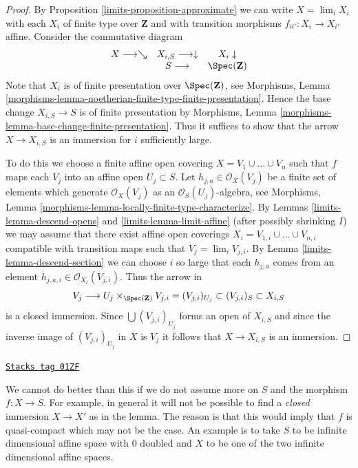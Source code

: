 \begin{proof}

By
Proposition \ref{limits-proposition-approximate}
we can write
$X = \lim_i X_i$ with each $X_i$ of finite type over $\mathbf{Z}$ and
with transition morphisms $f_{ii'} : X_i \to X_{i'}$ affine.
Consider the commutative diagram
$$
\begin{array}{ccc}X \longrightarrow\searrow & X_{i, S} \longrightarrow\downarrow & X_i \downarrow \\  & S \longrightarrow & \Spec(\mathbf{Z})\end{array}
$$
Note that $X_i$ is of finite presentation over $\Spec(\mathbf{Z})$, see
Morphisms,
Lemma \ref{morphisms-lemma-noetherian-finite-type-finite-presentation}.
Hence the base change $X_{i, S} \to S$ is of finite presentation by
Morphisms, Lemma \ref{morphisms-lemma-base-change-finite-presentation}.
Thus it suffices to show that the arrow $X \to X_{i, S}$ is an
immersion for $i$ sufficiently large.

\medskip\noindent
To do this we choose a finite affine open covering
$X = V_1 \cup \ldots \cup V_n$ such that
$f$ maps each $V_j$ into an affine open $U_j \subset S$.
Let $h_{j, a} \in \mathcal{O}_X(V_j)$ be a finite
set of elements which generate $\mathcal{O}_X(V_j)$ as
an $\mathcal{O}_S(U_j)$-algebra, see
Morphisms, Lemma \ref{morphisms-lemma-locally-finite-type-characterize}.
By Lemmas \ref{limits-lemma-descend-opens} and \ref{limits-lemma-limit-affine}
(after possibly shrinking $I$) we may assume that
there exist affine open coverings
$X_i = V_{1, i} \cup \ldots \cup V_{n, i}$
compatible with transition maps such that $V_j = \lim_i V_{j, i}$.
By Lemma \ref{limits-lemma-descend-section} we can choose $i$ so large that each
$h_{j, a}$ comes from an element
$h_{j, a, i} \in \mathcal{O}_{X_i}(V_{j, i})$.
Thus the arrow in
$$
V_j \longrightarrow U_j \times_{\Spec(\mathbf{Z})} V_{j, i} =
(V_{j, i})_{U_j} \subset (V_{j, i})_S \subset X_{i, S}
$$
is a closed immersion. Since $\bigcup (V_{j, i})_{U_j}$ forms an open of
$X_{i, S}$ and since the inverse image of $(V_{j, i})_{U_j}$ in $X$
is $V_j$ it follows that $X \to X_{i, S}$ is an immersion.
\end{proof}

\begin{remark}
\label{limits-remark-cannot-do-better}
\href{https://stacks.math.columbia.edu/tag/01ZF}{\texttt{Stacks tag 01ZF}}

We cannot do better than this if we do not assume
more on $S$ and the morphism $f : X \to S$.
For example, in general it will not be possible to
find a {\it closed} immersion $X \to X'$ as in the lemma.
The reason is that this would imply that $f$ is quasi-compact which
may not be the case. An example is to take $S$ to be infinite
dimensional affine space with $0$ doubled and $X$ to be one of
the two infinite dimensional affine spaces.
\end{remark}

